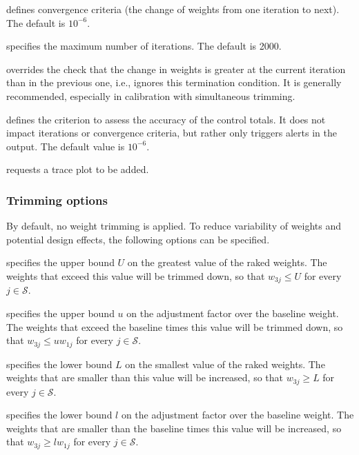 \hangpara
{} defines convergence criteria
(the change of weights from one iteration to next). The default is $10^{-6}$.

\hangpara
{} specifies the maximum number
of iterations. The default is 2000.

\hangpara
{} overrides the check
that the change in weights is greater at the current iteration
than in the previous one, i.e., ignores this termination condition.
It is generally recommended, especially in calibration with simultaneous trimming.

\hangpara
{} defines the criterion to
assess the accuracy of the control totals. It does not impact
iterations or convergence criteria, but rather only triggers alerts in the output.
The default value is $10^{-6}$.

\hangpara
{} requests a trace plot to be added.

\subsubsection{Trimming options}
\label{subsubsec:trimming}

By default, no weight trimming is applied. To reduce variability of weights
and potential design effects, the following options can be specified.

\hangpara
{} specifies the upper bound $U$ on the greatest
    value of the raked weights.  The weights that
    exceed this value will be trimmed down, so that
    $w_{3j} \le U$ for every $j\in\mathcal{S}$.

\hangpara
{} specifies the upper bound $u$ on the adjustment
    factor over the baseline weight. The weights
    that exceed the baseline times this value will be trimmed down,
    so that $w_{3j} \le u w_{1j}$ for every $j\in\mathcal{S}$.

\hangpara
{} specifies the lower bound $L$ on the smallest value
    of the raked weights.  The weights that are smaller than this value will
    be increased, so that $w_{3j} \ge L$ for every $j\in\mathcal{S}$.

\hangpara
{} specifies the lower bound $l$ on the adjustment factor
    over the baseline weight.  The weights that are smaller than the baseline
    times this value will be increased, so that
    $w_{3j} \ge l w_{1j}$ for every $j\in\mathcal{S}$.

